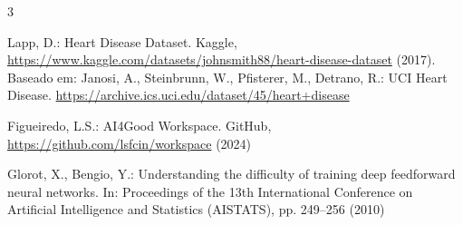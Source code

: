 \documentclass[runningheads]{llncs}
\begin{document}
\begin{thebibliography}{3}

Lapp, D.: Heart Disease Dataset.
Kaggle, \url{https://www.kaggle.com/datasets/johnsmith88/heart-disease-dataset} (2017).
Baseado em: Janosi, A., Steinbrunn, W., Pfisterer, M., Detrano, R.:
UCI Heart Disease. \url{https://archive.ics.uci.edu/dataset/45/heart+disease}

Figueiredo, L.S.: AI4Good Workspace.
GitHub, \url{https://github.com/lsfcin/workspace} (2024)

Glorot, X., Bengio, Y.: Understanding the difficulty of training
deep feedforward neural networks. In: Proceedings of the 13th
International Conference on Artificial Intelligence and Statistics
(AISTATS), pp. 249--256 (2010)

\end{thebibliography}
\end{document}
